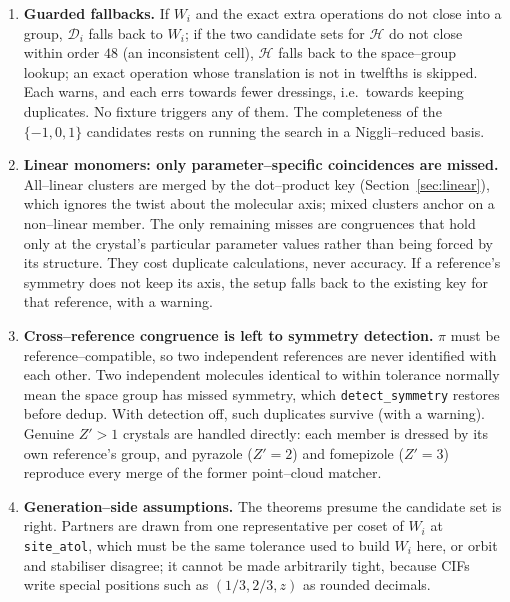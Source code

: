 \documentclass[11pt]{article}
\theoremstyle{definition}
\newcommand{\Hgrp}{\mathcal{H}}
\newcommand{\Dgrp}{\mathcal{D}}
\begin{document}
\begin{enumerate}[leftmargin=2em,label=\textbf{C\arabic*.}]
\item\label{cav:fallback}\textbf{Guarded fallbacks.} If $W_i$ and the exact
extra operations do not close into a group, $\Dgrp_i$ falls back to $W_i$; if the
two candidate sets for $\Hgrp$ do not close within order $48$ (an inconsistent
cell), $\Hgrp$ falls back to the space--group lookup; an exact operation whose
translation is not in twelfths is skipped. Each warns, and each errs towards
fewer dressings, i.e.\ towards keeping duplicates. No fixture triggers any of
them. The completeness of the $\{-1,0,1\}$ candidates rests on running the search
in a Niggli--reduced basis.

\item\label{cav:linear}\textbf{Linear monomers: only parameter--specific
coincidences are missed.} All--linear clusters are merged by the dot--product key
(Section~\ref{sec:linear}), which ignores the twist about the molecular axis;
mixed clusters anchor on a non--linear member. The only remaining misses are
congruences that hold only at the crystal's particular parameter values rather
than being forced by its structure. They cost duplicate calculations, never
accuracy. If a reference's symmetry does not keep its axis, the setup falls back
to the existing key for that reference, with a warning.

\item\label{cav:zprime}\textbf{Cross--reference congruence is left to symmetry
detection.} $\pi$ must be reference--compatible, so two independent references
are never identified with each other. Two independent molecules identical to
within tolerance normally mean the space group has missed symmetry, which
\texttt{detect\_symmetry} restores before dedup. With detection off, such
duplicates survive (with a warning). Genuine $Z'>1$ crystals are handled directly:
each member is dressed by its own reference's group, and pyrazole ($Z'=2$) and
fomepizole ($Z'=3$) reproduce every merge of the former point--cloud matcher.

\item\label{cav:gen}\textbf{Generation--side assumptions.} The theorems presume
the candidate set is right. Partners are drawn from one representative per coset
of $W_i$ at \texttt{site\_atol}, which must be the same tolerance used to build
$W_i$ here, or orbit and stabiliser disagree; it cannot be made arbitrarily
tight, because CIFs write special positions such as $(1/3,2/3,z)$ as rounded
decimals.

\end{enumerate}
\end{document}
